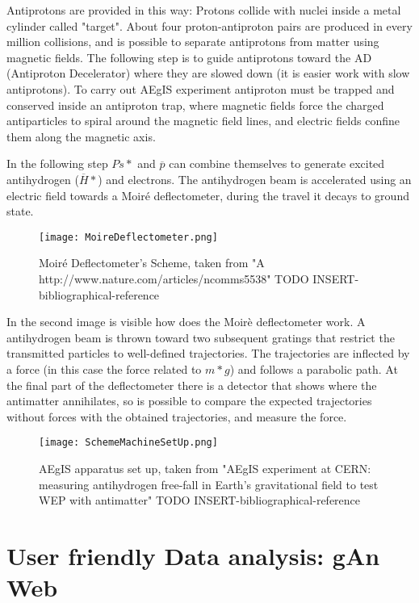 Antiprotons are provided in this way:
Protons collide with nuclei inside a metal cylinder called "target". About four proton-antiproton pairs are produced in every million collisions, and is possible to separate antiprotons from matter using magnetic fields. The following step is to guide antiprotons toward the AD (Antiproton Decelerator) where they are slowed down (it is easier work with slow antiprotons). To carry out AEgIS experiment antiproton must be trapped and conserved inside an antiproton trap, where magnetic fields force the charged antiparticles to spiral around the magnetic field lines, and electric fields confine them along the magnetic axis.

In the following step $ {Ps*} $ and $ \overline{p} $ can combine themselves to generate excited antihydrogen ($ \overline{H}* $) and electrons. The antihydrogen beam is accelerated using an electric field towards a Moiré deflectometer, during the travel it decays to ground state.  


\begin{figure}[H]
\centering
\texttt{[image: MoireDeflectometer.png]} 
\caption{Moiré Deflectometer's Scheme, taken from "A
http://www.nature.com/articles/ncomms5538" TODO INSERT-bibliographical-reference}
\end{figure}

In the second image is visible how does the Moirè deflectometer work.
A antihydrogen beam is thrown toward two subsequent gratings that restrict the transmitted particles to well-defined trajectories. The trajectories are inflected by a force (in this case the force related to $ {m*g} $) and follows a parabolic path. At the final part of the deflectometer there is a detector that shows where the antimatter annihilates, so is possible to compare the expected trajectories without forces with the obtained trajectories, and measure the force.


\begin{figure}[H]
\centering
\texttt{[image: SchemeMachineSetUp.png]} 
\caption{AEgIS apparatus set up, taken from "AEgIS experiment at CERN: measuring antihydrogen free-fall in Earth’s gravitational field to test WEP with antimatter" TODO INSERT-bibliographical-reference}
\end{figure}

\section{User friendly Data analysis: gAn Web}

